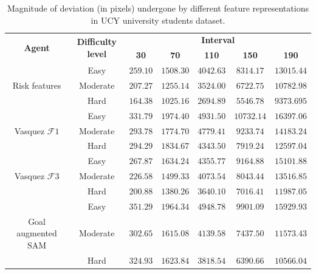 \begin{table}[htbp]
	\begin{center}
		\renewcommand{\arraystretch}{1.3}
		\begin{tabular}{|c|c|c|c|c|c|c|}
			\hline
			\multicolumn{1}{|c|}{\multirow{2}{*}{\textbf{Agent}}} & \multicolumn{1}{c|}{\multirow{2}{*}{\textbf{Difficulty level}}}  & \multicolumn{5}{c|}{\multirow{1}{*}{\textbf{Interval}}}\\ \cline{3-7}
			
			&& \textbf{30} & \textbf{70} & \textbf{110} & \textbf{150}  &  \textbf{190} \\
			\hline
								& Easy & $259.10$ & $1508.30$ & $4042.63$ & $8314.17$ & $13015.44$ \\ \cline{2-7}
			Risk features & Moderate & $207.27$ & $1255.14$ & $3524.00$ & $6722.75$ & $10782.98$ \\ \cline{2-7}
								& Hard & $164.38$ & $1025.16$ & $2694.89$ & $5546.78$ & $9373.695$ \\
			\hline
											& Easy & $331.79$ & $1974.40$ & $4931.50$ & $10732.14$ & $16397.06$ \\ \cline{2-7}
			Vasquez $\mathcal{F}1$ & Moderate & $293.78$ & $1774.70$ & $4779.41$ & $9233.74$ & $14183.24$ \\ \cline{2-7}
											& Hard & $294.29$ & $1834.67$ & $4343.50$ & $7919.24$ & $12597.04$ \\
			\hline
			 								& Easy & $267.87$ & $1634.24$ & $4355.77$ & $9164.88$ & $15101.88$ \\ \cline{2-7}
			Vasquez $\mathcal{F}3$ & Moderate & $226.58$ & $1499.33$ & $4073.54$ & $8043.44$ & $13516.85$ \\ \cline{2-7}
											& Hard & $200.88$ & $1380.26$ & $3640.10$ & $7016.41$ & $11987.05$ \\
			\hline			
		 							 	& Easy & $351.29$ & $1964.34$ & $4948.78$ & $9901.09$ & $15929.93$ \\ \cline{2-7}
			Goal augmented SAM & Moderate & $302.65$ & $1615.08$ & $4139.58$ & $7437.50$ & $11573.43$ \\ \cline{2-7}
										& Hard & $324.93$ & $1623.84$ & $3818.54$ & $6390.66$ & $10566.04$ \\
			\hline
		\end{tabular}
	\end{center}
	\caption{Magnitude of deviation (in pixels) undergone by different feature representations in UCY university students dataset.}
	\label{tab:ucy_inter_irl_drift_results}
\end{table}



